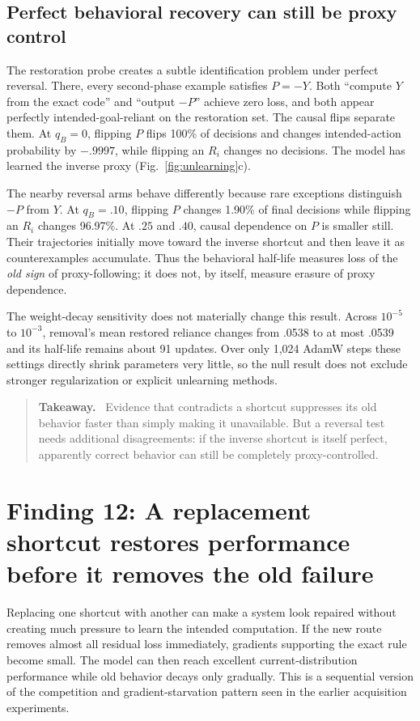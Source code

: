 \documentclass[11pt,a4paper]{article}
\newcommand{\fig}[1]{Fig.~\ref{#1}}
\newenvironment{takeaway}{%
  \begin{quote}\small\color{ink}\noindent\textbf{Takeaway.}\ 
}{%
  \end{quote}
}
\begin{document}
\subsection*{Perfect behavioral recovery can still be proxy control}

The restoration probe creates a subtle identification problem under perfect reversal. There, every second-phase example satisfies $P=-Y$. Both ``compute $Y$ from the exact code'' and ``output $-P$'' achieve zero loss, and both appear perfectly intended-goal-reliant on the restoration set. The causal flips separate them. At $q_B=0$, flipping $P$ flips 100\% of decisions and changes intended-action probability by $-.9997$, while flipping an $R_i$ changes no decisions. The model has learned the inverse proxy (\fig{fig:unlearning}c).

The nearby reversal arms behave differently because rare exceptions distinguish $-P$ from $Y$. At $q_B=.10$, flipping $P$ changes 1.90\% of final decisions while flipping an $R_i$ changes 96.97\%. At $.25$ and $.40$, causal dependence on $P$ is smaller still. Their trajectories initially move toward the inverse shortcut and then leave it as counterexamples accumulate. Thus the behavioral half-life measures loss of the \emph{old sign} of proxy-following; it does not, by itself, measure erasure of proxy dependence.

The weight-decay sensitivity does not materially change this result. Across $10^{-5}$ to $10^{-3}$, removal's mean restored reliance changes from .0538 to at most .0539 and its half-life remains about 91 updates. Over only 1,024 AdamW steps these settings directly shrink parameters very little, so the null result does not exclude stronger regularization or explicit unlearning methods.

\begin{takeaway}
Evidence that contradicts a shortcut suppresses its old behavior faster than simply making it unavailable. But a reversal test needs additional disagreements: if the inverse shortcut is itself perfect, apparently correct behavior can still be completely proxy-controlled.
\end{takeaway}

\section*{Finding 12: A replacement shortcut restores performance before it removes the old failure}

Replacing one shortcut with another can make a system look repaired without creating much pressure to learn the intended computation. If the new route removes almost all residual loss immediately, gradients supporting the exact rule become small. The model can then reach excellent current-distribution performance while old behavior decays only gradually. This is a sequential version of the competition and gradient-starvation pattern seen in the earlier acquisition experiments.
\end{document}
